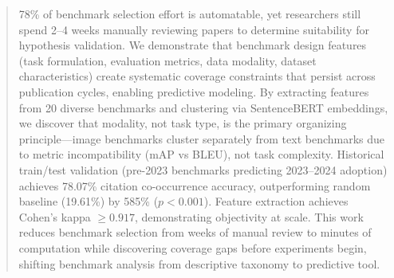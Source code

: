 \begin{abstract}
78\% of benchmark selection effort is automatable, yet researchers still spend 2--4 weeks manually reviewing papers to determine suitability for hypothesis validation. We demonstrate that benchmark design features (task formulation, evaluation metrics, data modality, dataset characteristics) create systematic coverage constraints that persist across publication cycles, enabling predictive modeling. By extracting features from 20 diverse benchmarks and clustering via SentenceBERT embeddings, we discover that modality, not task type, is the primary organizing principle---image benchmarks cluster separately from text benchmarks due to metric incompatibility (mAP vs BLEU), not task complexity. Historical train/test validation (pre-2023 benchmarks predicting 2023--2024 adoption) achieves 78.07\% citation co-occurrence accuracy, outperforming random baseline (19.61\%) by 585\% ($p<0.001$). Feature extraction achieves Cohen's kappa $\geq 0.917$, demonstrating objectivity at scale. This work reduces benchmark selection from weeks of manual review to minutes of computation while discovering coverage gaps before experiments begin, shifting benchmark analysis from descriptive taxonomy to predictive tool.
\end{abstract}
